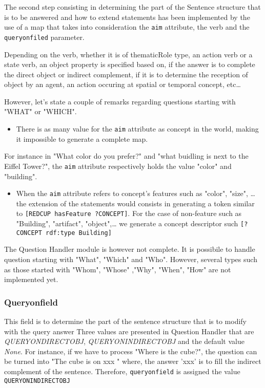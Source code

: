 \documentclass[twoside,a4paper,10pt]{report}
\begin{document}
The second step consisting in determining the part of the Sentence structure that is to be answered and how to extend statements has been implemented by the use of a map that takes into consideration the \texttt{aim} attribute, the verb and the \texttt{query{\textunderscore}on{\textunderscore}filed} parameter.

Depending on the verb, whether it is of thematicRole type, an action verb or a state verb, an object property is specified based on, if the answer is to complete the direct object or indirect complement, if it is to determine the reception of object by an agent, an action occuring at spatial or temporal concept, etc\ldots{}

However, let's state a couple of remarks regarding questions starting with "WHAT" or "WHICH".


\begin{itemize}
    \item  There is as many value for the \texttt{aim} attribute as concept in the world, making it impossible to generate a complete map.
\end{itemize}
 For instance in "What color do you prefer?" and "what buidling is next to the Eiffel Tower?", the \texttt{aim} attribute respectively holds the value "color" and  "building".



\begin{itemize}
    \item  When the \texttt{aim} attribute refers to concept's features such as "color", "size", \ldots{}  the extension of the statements would consists in generating a token similar to \texttt{[RED{\textunderscore}CUP hasFeature ?CONCEPT]}. For the case of non-feature such as "Building", "artifact", "object",\ldots{} we generate a concept descriptor such \texttt{[?CONCEPT rdf:type Building]}
\end{itemize}
The Question Handler module is however not complete. It is possibile to handle question starting with "What", "Which" and "Who". However,  several types such as those started with "Whom", "Whose" ,"Why", "When", "How" are not implemented yet.


\subsubsection{Query{\textunderscore}on{\textunderscore}field}

This field is to determine the part of the sentence structure that is to modify with the query answer
Three values are presented in Question Handler that are \textsl{QUERY{\textunderscore}ON{\textunderscore}DIRECT{\textunderscore}OBJ}, \textsl{QUERY{\textunderscore}ON{\textunderscore}INDIRECT{\textunderscore}OBJ} and the default value \textsl{None}.
For instance, if we have to process "Where is the cube?", the question can be turned into "The cube is on xxx " where, the answer 'xxx' is to fill the indirect complement of the sentence. 
Therefore, \texttt{query{\textunderscore}on{\textunderscore}field} is assigned the value \texttt{QUERY{\textunderscore}ON{\textunderscore}INDIRECT{\textunderscore}OBJ}
\end{document}
